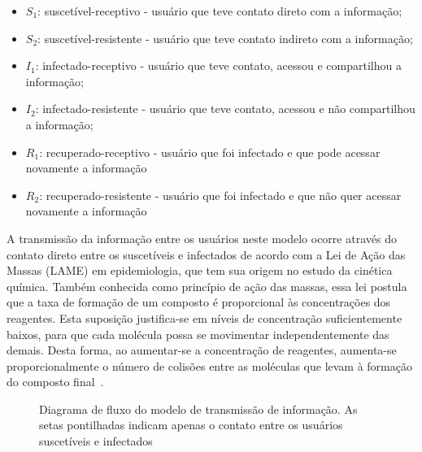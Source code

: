 \documentclass[
	12pt,				%
	openright,			%
	oneside,			%
	a4paper,			%
	english,			%
	french,				%
	spanish,			%
	brazil				%
	]{abntex2}
\begin{document}
\begin{itemize}
\item $S_1$: suscetível-receptivo - usuário que teve contato direto com a informação;
\item $S_2$: suscetível-resistente - usuário que teve contato indireto com a informação;
\item $I_1$: infectado-receptivo - usuário que teve contato, acessou e compartilhou a informação;
\item $I_2$: infectado-resistente - usuário que teve contato, acessou e não compartilhou a informação;
\item $R_1$: recuperado-receptivo - usuário que foi infectado e que pode acessar novamente a informação
\item $R_2$: recuperado-resistente - usuário que foi infectado e que não quer acessar novamente a informação
\end{itemize}

A transmissão da informação entre os usuários neste modelo ocorre
através do contato direto entre os suscetíveis e infectados de acordo
com a Lei de Ação das Massas (LAME) em epidemiologia, que tem sua
origem no estudo da cinética química. Também conhecida como princípio
de ação das massas, essa lei postula que a taxa de formação de um
composto é proporcional às concentrações dos reagentes. Esta suposição
justifica-se em níveis de concentração suficientemente baixos, para
que cada molécula possa se movimentar independentemente das
demais. Desta forma, ao aumentar-se a concentração de reagentes,
aumenta-se proporcionalmente o número de colisões entre as moléculas
que levam à formação do composto final~\cite{coutinho2004}.

\begin{center}
    \begin{figure}
      \begin{center}
        \setlength\fboxsep{0pt}
        \setlength\fboxrule{0pt}
        \caption{Diagrama de fluxo do modelo de transmissão de
          informação. As setas pontilhadas indicam apenas o contato
          entre os usuários suscetíveis e infectados}
        \label{fig:diagramadefluxo}
      \end{center}
    \end{figure}
\end{center}
\end{document}
